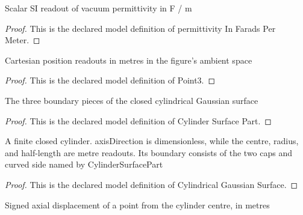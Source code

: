 \begin{definition}
  \label{def:physics:phyx-mini-0848:phyxminiproblems-problemphyxmini0848-permittivityinfaradspermeter}
  Scalar SI readout of vacuum permittivity in F / m
\end{definition}
\begin{proof}
  This is the declared model definition of permittivity In Farads Per Meter.
\end{proof}
\begin{definition}[Point3]
  \label{def:physics:phyx-mini-0848:phyxminiproblems-problemphyxmini0848-point3}
  Cartesian position readouts in metres in the figure's ambient space
\end{definition}
\begin{proof}
  This is the declared model definition of Point3.
\end{proof}
\begin{definition}
  \label{def:physics:phyx-mini-0848:phyxminiproblems-problemphyxmini0848-cylindersurfacepart}
  The three boundary pieces of the closed cylindrical Gaussian surface
\end{definition}
\begin{proof}
  This is the declared model definition of Cylinder Surface Part.
\end{proof}
\begin{definition}
  \label{def:physics:phyx-mini-0848:phyxminiproblems-problemphyxmini0848-cylindricalgaussiansurface}
  A finite closed cylinder. axisDirection is dimensionless, while the centre, radius, and half-length are metre readouts. Its boundary consists of the two caps and curved side named by CylinderSurfacePart
\end{definition}
\begin{proof}
  This is the declared model definition of Cylindrical Gaussian Surface.
\end{proof}
\begin{definition}
  \label{def:physics:phyx-mini-0848:phyxminiproblems-problemphyxmini0848-cylindricalgaussiansurface-axialoffsetmeters}
  Signed axial displacement of a point from the cylinder centre, in metres
\end{definition}
